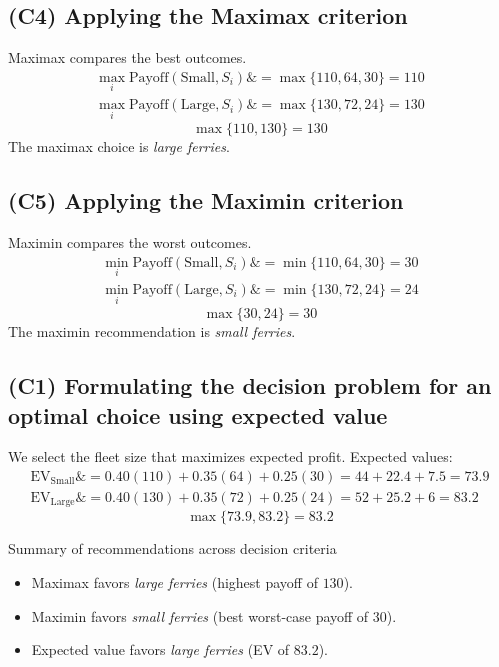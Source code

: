\documentclass[11pt]{article}
\begin{document}
	\subsection*{(C4) Applying the Maximax criterion}
	
	\hypertarget{problem7-c4}{}
	
	Maximax compares the best outcomes.
	\[
	\begin{aligned}
		\max_i \text{Payoff}(\text{Small}, S_i) \&= \max\{110, 64, 30\} = 110 \\
		\max_i \text{Payoff}(\text{Large}, S_i) \&= \max\{130, 72, 24\} = 130
	\end{aligned}
	\]
	\[
	\max\{110, 130\} = 130
	\]
	The maximax choice is \emph{large ferries}.
	
	\subsection*{(C5) Applying the Maximin criterion}
	
	\hypertarget{problem7-c5}{}
	
	Maximin compares the worst outcomes.
	\[
	\begin{aligned}
		\min_i \text{Payoff}(\text{Small}, S_i) \&= \min\{110, 64, 30\} = 30 \\
		\min_i \text{Payoff}(\text{Large}, S_i) \&= \min\{130, 72, 24\} = 24
	\end{aligned}
	\]
	\[
	\max\{30, 24\} = 30
	\]
	The maximin recommendation is \emph{small ferries}.
	
	\subsection*{(C1) Formulating the decision problem for an optimal choice using expected value}
	
	\hypertarget{problem7-c1}{}
	
	We select the fleet size that maximizes expected profit. Expected values:
	\[
	\begin{aligned}
		\mathrm{EV}_{\text{Small}} \&= 0.40(110) + 0.35(64) + 0.25(30) = 44 + 22.4 + 7.5 = 73.9 \\
		\mathrm{EV}_{\text{Large}} \&= 0.40(130) + 0.35(72) + 0.25(24) = 52 + 25.2 + 6 = 83.2
	\end{aligned}
	\]
	\[
	\max\{73.9, 83.2\} = 83.2
	\]
	
	Summary of recommendations across decision criteria
	\begin{itemize}
		\item Maximax favors \emph{large ferries} (highest payoff of $130$).
		\item Maximin favors \emph{small ferries} (best worst-case payoff of $30$).
		\item Expected value favors \emph{large ferries} (EV of $83.2$).
	\end{itemize}
	
\end{document}
